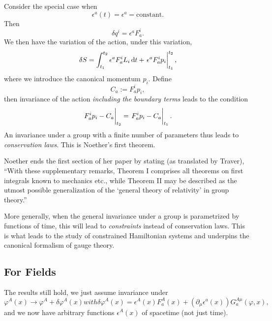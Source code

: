 Consider the special case when
\begin{equation}
\epsilon^{a}(t) = \epsilon^{a} = \mbox{constant}.
\end{equation}
Then
\begin{equation}
\delta q^{i} = \epsilon^{a}F^{i}_{a}.
\end{equation}
We then have the variation of the action, under this variation,
\begin{equation}
\delta\action = \int^{t_{2}}_{t_{1}}\epsilon^{a}F^{i}_{a}L_{i}\,\D t + \left.\vphantom{\frac{1}{1}}\epsilon^{a}F^{i}_{a}p_{i}\right|^{t_{2}}_{t_{1}},
\end{equation}
where we introduce the canonical momentum $p_{i}$. Define
\begin{equation}
C_{a} := F^{i}_{a}p_{i},
\end{equation}
then invariance of the action \emph{including the boundary terms}
leads to the condition
\begin{equation}
\left.\vphantom{\frac{1}{1}}F^{i}_{a}p_{i}-C_{a}\right|_{t_{2}}
=
\left.\vphantom{\frac{1}{1}}F^{i}_{a}p_{i}-C_{a}\right|_{t_{1}}.
\end{equation}
An invariance under a group with a finite number of parameters thus
leads to \emph{conservation laws}. This is Noether's first theorem.

\begin{remark}
Noether ends the first section of her paper by stating (as translated by
Traver), ``With these supplementary remarks, Theorem I comprises all
theorems on first integrals known to mechanics etc., while Theorem II
may be described as the utmost possible generalization of the `general
theory of relativity' in group theory.''
\end{remark}

\begin{remark}
More generally, when the general invariance under a group is
parametrized by functions of time, this will lead to \emph{constraints}
instead of conservation laws. This is what leads to the study of
constrained Hamiltonian systems and underpins the canonical formalism of
gauge theory.
\end{remark}

\subsection{For Fields}

\M
The results still hold, we just assume invariance under
\begin{subequations}
\begin{equation}
\varphi^{A}(x)\to\varphi^{A}+\delta\varphi^{A}(x)
\end{equation}
with
\begin{equation}
\delta\varphi^{A}(x) = \epsilon^{A}(x)F^{A}_{a}(x) + (\partial_{\mu}\epsilon^{a}(x))G^{A\mu}_{a}(\varphi,x),
\end{equation}
\end{subequations}
and we now have arbitrary functions $\epsilon^{A}(x)$ of spacetime (not
just time).

